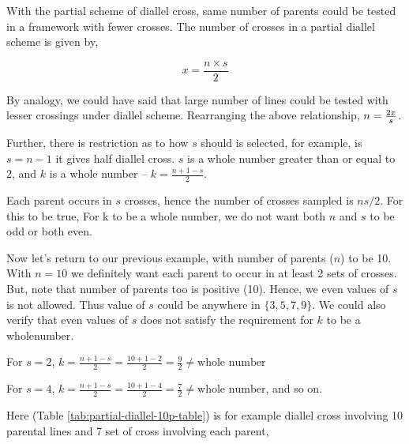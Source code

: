 \documentclass[nofonts,]{tufte-handout}
\begin{document}
With the partial scheme of diallel cross, same number of parents could
be tested in a framework with fewer crosses. The number of crosses in a
partial diallel scheme is given by,

\[
x = \frac{n \times s}{2}
\]

By analogy, we could have said that large number of lines could be
tested with lesser crossings under diallel scheme. Rearranging the above
relationship, \(\large n = \frac{2x}{s}\).

Further, there is restriction as to how \(s\) should is selected, for
example, is \(s = n -1\) it gives half diallel cross. \(s\) is a whole
number greater than or equal to 2, and \(k\) is a whole number --
\(k = \frac{n + 1 - s}{2}\).

Each parent occurs in \(s\) crosses, hence the number of crosses sampled
is \(ns/2\). For this to be true, For k to be a whole number, we do not
want both \(n\) and \(s\) to be odd or both even.

Now let's return to our previous example, with number of parents (\(n\))
to be 10. With \(n = 10\) we definitely want each parent to occur in at
least 2 sets of crosses. But, note that number of parents too is
positive (10). Hence, we even values of \(s\) is not allowed. Thus value
of \(s\) could be anywhere in \(\{3, 5, 7, 9\}\). We could also verify
that even values of \(s\) does not satisfy the requirement for \(k\) to
be a wholenumber.

For \(s = 2\),
\(k = \frac{n + 1 - s}{2} = \frac{10 + 1 - 2}{2} = \frac{9}{2} \neq \textrm{whole number}\)

For \(s = 4\),
\(k = \frac{n + 1 - s}{2} = \frac{10 + 1 - 4}{2} = \frac{7}{2} \neq \textrm{whole number}\),
and so on.

Here (Table \ref{tab:partial-diallel-10p-table}) is for example diallel
cross involving 10 parental lines and 7 set of cross involving each
parent,

\begingroup\fontsize{8}{10}\selectfont
\end{document}
